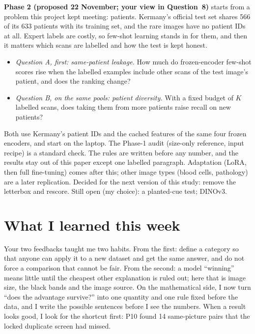 \documentclass[10pt,a4paper]{article}
\begin{document}
\smallskip
\noindent
\textbf{Phase 2 (proposed 22 November; your view in Question~8)} starts from a problem this project kept meeting:
patients. Kermany's official test set shares 566 of its 633 patients with its training set, and the rare images
have no patient IDs at all. Expert labels are costly, so few-shot learning stands in for them, and then it matters
which scans are labelled and how the test is kept honest.
\begin{itemize}
  \item \emph{Question A, first: same-patient leakage.} How much do frozen-encoder few-shot scores rise when the
        labelled examples include other scans of the test image's patient, and does the ranking change?
  \item \emph{Question B, on the same pools: patient diversity.} With a fixed budget of $K$ labelled scans, does
        taking them from more patients raise recall on new patients?
\end{itemize}
Both use Kermany's patient IDs and the cached features of the same four frozen encoders, and start on the laptop.
The Phase-1 audit (size-only reference, input recipe) is a standard check. The rules are written before any number,
and the results stay out of this paper except one labelled paragraph. Adaptation (LoRA, then full fine-tuning) comes
after this; other image types (blood cells, pathology) are a later replication. Decided for the next version of
this study: remove the letterbox and rescore. Still open (my choice): a planted-cue test; DINOv3.

\section*{What I learned this week}

Your two feedbacks taught me two habits. From the first: define a category so that anyone can apply it to a new
dataset and get the same answer, and do not force a comparison that cannot be fair. From the second: a model
``winning'' means little until the cheapest other explanation is ruled out; here that is image size, the black
bands and the image source. On the mathematical side, I now turn ``does the advantage survive?'' into one
quantity and one rule fixed before the data, and I write the possible sentences before I see the numbers. When a
result looks good, I look for the shortcut first: P10 found 14 same-picture pairs that the locked duplicate screen
had missed.
\end{document}
